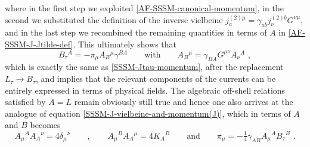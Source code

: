 \documentclass[12pt]{article}
\numberwithin{equation}{section}
\begin{document}
where in the first step we exploited \eqref{AF-SSSM-canonical-momentum}, in the second we substituted the definition of the inverse vielbeine $j_{a}^{(2)\mu}=\gamma_{ab}j_{\nu}^{(2)b}G^{\nu\mu}$, and in the last step we recombined the remaining quantities in terms of $A$ in \eqref{AF-SSSM-J-Jtilde-def}. This ultimately shows that
\begin{equation}\label{AF-SSSM-Jtau-momentum}
B_{\tau}{}^{A}=-\pi_{\mu}A_{B}{}^{\mu}\gamma^{BA} 
\qquad \text{with} \qquad 
A_{B}{}^{\mu}=\gamma_{BA}G^{\mu\nu}A_{\nu}{}^{A} \,\, ,
\end{equation}
which is exactly the same as \eqref{SSSM-Jtau-momentum}, after the replacement $L_{\tau}\rightarrow B_{\tau}$, and implies that the relevant components of the currents can be entirely expressed in terms of physical fields. The algebraic off-shell relations satisfied by $A=L$ remain obviously still true and hence one also arrives at the analogue of equation \eqref{SSSM-J-vielbeine-and-momentum(J)}, which in terms of $A$ and $B$ becomes
\begin{equation}\label{AF-SSSM-J-vielbeine-and-momentum(J)}
A_{\mu}{}^{A}A_{A}{}^{\nu}=4\delta_{\mu}{}^{\nu} \qquad , \qquad A_{\mu}{}^{B}A_{A}{}^{\mu}=4K_{A}{}^{B} \qquad \text{and} \qquad \pi_{\mu}=-\tfrac{1}{4}\gamma_{AB}A_{\mu}{}^{A}B_{\tau}{}^{B}\,\, .
\end{equation}
\end{document}
